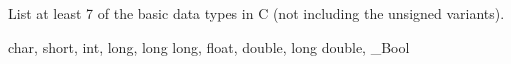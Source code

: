 List at least 7 of the basic data types in C (not including the unsigned variants).

\begin{answer}
char, short, int, long, long long, float, double, long double, \_Bool
\end{answer}
